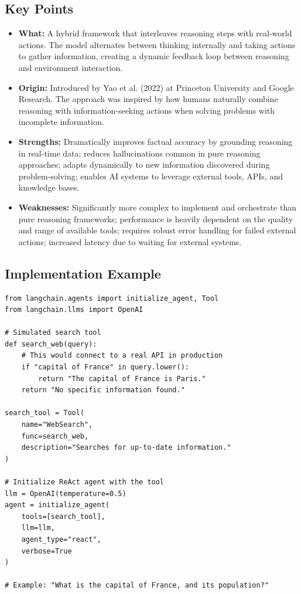 \documentclass[12pt,letterpaper]{article}
\newenvironment{macterminal}{%
    \begin{mdframed}[
        linecolor=terminalFrame,
        backgroundcolor=terminalBg,
        roundcorner=5pt,
        skipabove=5pt,
        skipbelow=5pt,
        linewidth=1pt,
        innertopmargin=5pt,
        frametitle={%
            \tikz[baseline=(current bounding box.east), outer sep=0pt]{
                \fill[red!80!black] (0,0) circle (5pt);
                \fill[yellow!80!black] (0.7,0) circle (5pt);
                \fill[green!70!black] (1.4,0) circle (5pt);
            }
        },
        frametitlealignment=\raggedright,
        frametitleaboveskip=8pt,
        frametitlebelowskip=0pt,
    ]
}{%
    \end{mdframed}%
}
\begin{document}
\subsection{Key Points}
\begin{itemize}
    \item \textbf{\textcolor{pythonBlue}{What:}} A hybrid framework that interleaves reasoning steps with real-world actions. The model alternates between thinking internally and taking actions to gather information, creating a dynamic feedback loop between reasoning and environment interaction.
    
    \item \textbf{\textcolor{pythonBlue}{Origin:}} Introduced by Yao et al. (2022) at Princeton University and Google Research. The approach was inspired by how humans naturally combine reasoning with information-seeking actions when solving problems with incomplete information.
    
    \item \textbf{\textcolor{pythonBlue}{Strengths:}} Dramatically improves factual accuracy by grounding reasoning in real-time data; reduces hallucinations common in pure reasoning approaches; adapts dynamically to new information discovered during problem-solving; enables AI systems to leverage external tools, APIs, and knowledge bases.
    
    \item \textbf{\textcolor{pythonBlue}{Weaknesses:}} Significantly more complex to implement and orchestrate than pure reasoning frameworks; performance is heavily dependent on the quality and range of available tools; requires robust error handling for failed external actions; increased latency due to waiting for external systems.
\end{itemize}

\subsection{Implementation Example}

\begin{macterminal}
\begin{lstlisting}
from langchain.agents import initialize_agent, Tool
from langchain.llms import OpenAI

# Simulated search tool
def search_web(query):
    # This would connect to a real API in production
    if "capital of France" in query.lower():
        return "The capital of France is Paris."
    return "No specific information found."

search_tool = Tool(
    name="WebSearch",
    func=search_web,
    description="Searches for up-to-date information."
)

# Initialize ReAct agent with the tool
llm = OpenAI(temperature=0.5)
agent = initialize_agent(
    tools=[search_tool],
    llm=llm,
    agent_type="react",
    verbose=True
)

# Example: "What is the capital of France, and its population?"
\end{lstlisting}
\end{macterminal}
\end{document}

